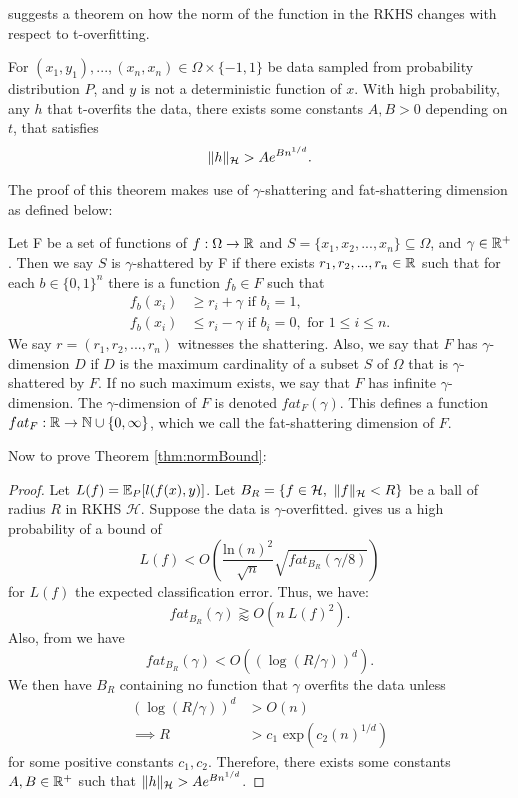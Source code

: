 \documentclass[twoside]{memoir}
\begin{document}
\cite{UnderstandKernel} suggests a theorem on how the norm of the function in the RKHS changes with respect to t-overfitting.
\begin{thm} \label{thm:normBound}
	For $(x_1 ,y_1),..., (x_n,x_n) \in \Omega \times \{-1, 1\}$ be data sampled from probability distribution $P$, and $y$ is not a deterministic function of $x$. With high probability, any $h$ that t-overfits the data, there exists some constants  $A, B > 0$ depending on $t$, that satisfies
	\[\lVert h\rVert_{\mathcal{H}} > Ae^{Bn^{1/d}}. \]
\end{thm}

The proof of this theorem makes use of $\gamma$-shattering and fat-shattering dimension as defined below:
\begin{defn}
	Let F be a set of functions of $f: \Omega \rightarrow \mathbb{R}$ and $S = \{x_1, x_2, ..., x_n\} \subseteq \Omega$, and $\gamma \in \mathbb{R}^+$. Then we say $S$ is $\gamma$-shattered by F if there exists $r_1, r_2,..., r_n \in \mathbb{R}$ such that for each $b \in \{0, 1\}^n$ there is a function $f_b \in F$ such that
	\begin{equation*}
	\begin{split}
	f_b(x_i) &\geq r_i + \gamma \text{ if } b_i = 1, \\
	f_b(x_i) &\leq r_i - \gamma \text{ if } b_i = 0, \text{ for } 1 \leq i \leq n.
	\end{split}	
	\end{equation*}
	We say $r = (r_1, r_2,..., r_n)$ witnesses the shattering.
	Also, we say that $F$ has $\gamma$-dimension $D$ if $D$ is the maximum	cardinality of a subset $S$ of $\Omega$ that is $\gamma$-shattered by $F$. If no such maximum exists, we say that $F$ has infinite $\gamma$-dimension. The $\gamma$-dimension of $F$ is denoted $fat_F(\gamma)$. This defines a function $fat_F: \mathbb{R} \rightarrow \mathbb{N} \cup \{0,\infty\}$, which we call the fat-shattering dimension of $F$.
\end{defn}
Now to prove Theorem \ref{thm:normBound}:
\begin{proof}
	Let $L(f) = \mathbb{E}_P[l(f(x), y)]$.
	Let $B_R = \{ f \in \mathcal{H},~ \lVert f\rVert_\mathcal{H} < R \}$ be a ball of radius $R$ in RKHS $\mathcal{H}$. Suppose the data is $\gamma$-overfitted. \cite{LossFATBound} gives us a high probability of a bound of
	\[ L(f) < O(\frac{\text{ln}(n)^2}{\sqrt{n}}\sqrt{fat_{B_R}(\gamma/8)}) \] for $L(f)$ the expected classification error. Thus, we have:
	\[ fat_{B_R}(\gamma) \gtrapprox O(n ~L(f)^2). \]
	Also, from \cite{ApproximationConcentration} we have \[fat_{B_R}(\gamma) < O((\log(R/\gamma))^d).\]
	We then have $B_R$ containing no function that $\gamma$ overfits the data unless
	\begin{equation*}
	\begin{split}
	(\log(R/\gamma))^d &> O(n) \\
	\implies R &> c_1 \text{ exp}(c_2(n)^{1/d})
	\end{split}
	\end{equation*}
	for some positive constants $c_1, c_2$. Therefore, there exists some constants $A, B \in \mathbb{R}^+$ such that $\lVert h\rVert_{\mathcal{H}} > Ae^{Bn^{1/d}}$. 
\end{proof}
\end{document}
